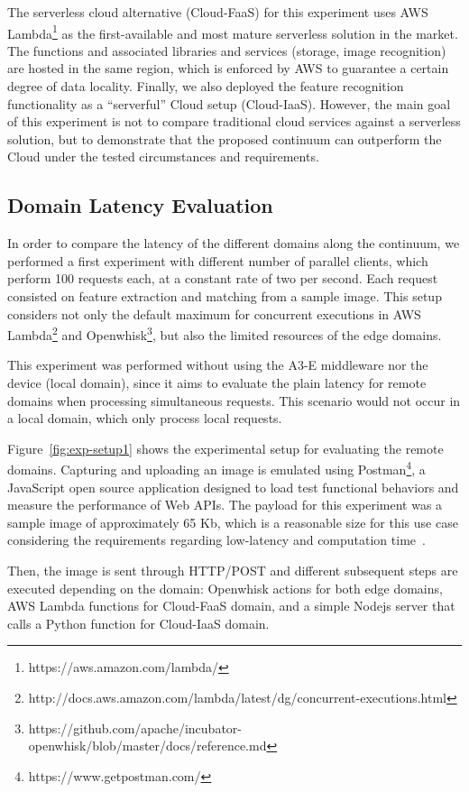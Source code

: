 The serverless cloud alternative (Cloud-FaaS) for this experiment uses AWS Lambda\footnote{https://aws.amazon.com/lambda/} as the first-available and most mature serverless solution in the market. The functions and associated libraries and services (storage, image recognition) are hosted in the same region, which is enforced by AWS to guarantee a certain degree of data locality. Finally, we also deployed the feature recognition functionality as a ``serverful'' Cloud setup (Cloud-IaaS). However, the main goal of this experiment is not to compare traditional cloud services against a serverless solution, but to demonstrate that the proposed continuum can outperform the Cloud under the tested circumstances and requirements.


\subsection{Domain Latency Evaluation} 

In order to compare the latency of the different domains along the continuum, we performed a first experiment with different number of parallel clients, which perform 100 requests each, at a constant rate of two per second. Each request consisted on feature extraction and matching from a sample image. This setup considers not only the default maximum for concurrent executions in AWS Lambda\footnote{http://docs.aws.amazon.com/lambda/latest/dg/concurrent-executions.html} and Openwhisk\footnote{https://github.com/apache/incubator-openwhisk/blob/master/docs/reference.md}, but also the limited resources of the edge domains. 

This experiment was performed without using the A3-E middleware nor the device (local domain), since it aims to evaluate the plain latency for remote domains  when processing simultaneous requests. This scenario would not occur in a local domain, which only process local requests.

Figure~\ref{fig:exp-setup1} shows the experimental setup for evaluating the remote domains. Capturing and uploading an image is emulated using Postman\footnote{https://www.getpostman.com/}, a JavaScript open source application designed to load test functional behaviors and measure the performance of Web APIs. The  payload for this experiment was a sample image of approximately 65 Kb, which is a reasonable size for this use case considering the requirements regarding low-latency and computation time~\cite{rodriguez16mobile}. 

Then, the image is sent through HTTP/POST and different subsequent steps are executed depending on the domain: Openwhisk actions for both edge domains, AWS Lambda functions for Cloud-FaaS domain, and a simple Nodejs server that calls a Python function for Cloud-IaaS domain.

